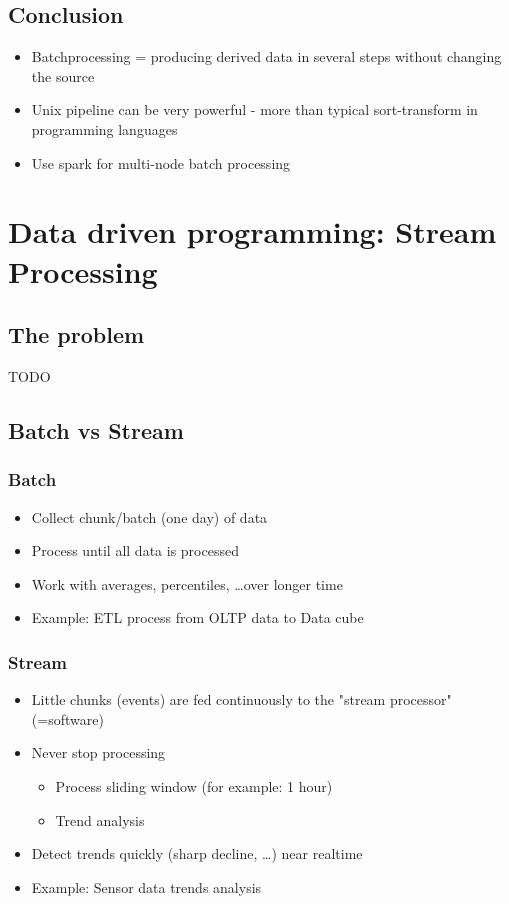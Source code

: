 \documentclass{article}
\begin{document}
\subsection{Conclusion}

\begin{itemize}
    \item Batchprocessing = producing derived data in several steps without changing the source
    \item Unix pipeline can be very powerful - more than typical sort-transform in programming languages
    \item Use spark for multi-node batch processing
\end{itemize}

\section{Data driven programming: Stream Processing}

\subsection{The problem}

TODO

\subsection{Batch vs Stream}

\subsubsection{Batch}

\begin{itemize}
    \item Collect chunk/batch (one day) of data
    \item Process until all data is processed
    \item Work with averages, percentiles, \dots over longer time
    \item Example: ETL process from OLTP data to Data cube
\end{itemize}

\subsubsection{Stream}

\begin{itemize}
    \item Little chunks (events) are fed continuously to the "stream processor" (=software)
    \item Never stop processing
    \begin{itemize}
        \item Process sliding window (for example: 1 hour)
        \item Trend analysis
    \end{itemize}
    \item Detect trends quickly (sharp decline, \dots) near realtime
    \item Example: Sensor data trends analysis
\end{itemize}
\end{document}
